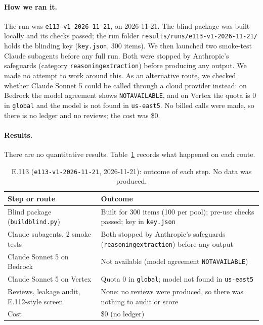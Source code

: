 \documentclass[11pt]{article}
\renewcommand{\_}{\origunderscore\allowbreak}
\begin{document}
\paragraph{How we ran it.}
The run was \texttt{e113-v1-2026-11-21}, on 2026-11-21. The blind package was built locally and its checks passed; the run folder \texttt{results/runs/e113-v1-2026-11-21/} holds the blinding key (\texttt{key.json}, 300 items). We then launched two smoke-test Claude subagents before any full run. Both were stopped by Anthropic's safeguards (category \texttt{reasoning\_extraction}) before producing any output. We made no attempt to work around this. As an alternative route, we checked whether Claude Sonnet 5 could be called through a cloud provider instead: on Bedrock the model agreement shows \texttt{NOT\_AVAILABLE}, and on Vertex the quota is 0 in \texttt{global} and the model is not found in \texttt{us-east5}. No billed calls were made, so there is no ledger and no reviews; the cost was \$0.

\paragraph{Results.}
There are no quantitative results. Table~\ref{tab:e113-outcome} records what happened on each route.

\begin{table}[H]
\centering
\small
\begin{tabularx}{\textwidth}{p{}X}
\toprule
Step or route & Outcome \\
\midrule
Blind package (\texttt{build\_blind.py}) & Built for 300 items (100 per pool); pre-use checks passed; key in \texttt{key.json} \\
Claude subagents, 2 smoke tests & Both stopped by Anthropic's safeguards (\texttt{reasoning\_extraction}) before any output \\
Claude Sonnet 5 on Bedrock & Not available (model agreement \texttt{NOT\_AVAILABLE}) \\
Claude Sonnet 5 on Vertex & Quota 0 in \texttt{global}; model not found in \texttt{us-east5} \\
Reviews, leakage audit, E.112-style screen & None: no reviews were produced, so there was nothing to audit or score \\
Cost & \$0 (no ledger) \\
\bottomrule
\end{tabularx}
\caption{E.113 (\texttt{e113-v1-2026-11-21}, 2026-11-21): outcome of each step. No data was produced.}
\label{tab:e113-outcome}
\end{table}
\end{document}
